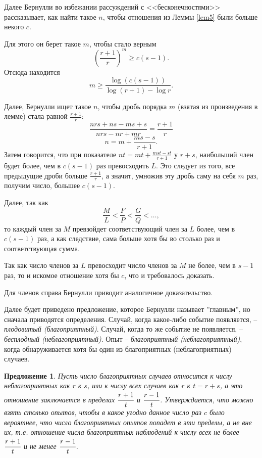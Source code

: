\documentclass[12pt]{extarticle}
\newtheorem{proposition}{Предложение}
\begin{document}
Далее Бернулли во избежании рассуждений с <<бесконечностями>> рассказывает, как найти такое $n$, чтобы отношения из Леммы \ref{lem5} были больше некого $c$.

Для этого он берет такое $m$, чтобы стало верным 
$$\left(\frac{r+1}{r}\right)^m \geqslant c (s-1).$$
Отсюда находится $$m \geqslant \frac{\log (c(s-1))}{\log (r+1) - \log r}.$$

Далее, Бернулли ищет такое $n$, чтобы дробь порядка $m$ (взятая из произведения в лемме) стала равной $\frac{r+1}{r}$:
$$\frac{nrs+ns-ms+s}{nrs-nr+mr} = \frac{r+1}{r}$$ 
$$n = m + \frac{ms-s}{r+1}.$$
Затем говорится, что при показателе $nt = mt+\frac{mst-st}{r+1}$ у $r+s$, наибольший член будет более, чем в $c(s-1)$ раз превосходить  $L$.
Это следует из того, все предыдущие дроби больше $\frac{r+1}{r}$, а значит, умножив эту дробь саму на себя $m$ раз, получим число, большее $c(s-1)$.

Далее, так как $$\frac{M}{L} < \frac{F}{P} < \frac{G}{Q} < \dots,$$
то каждый член за $M$ превзойдет соответствующий член за $L$ более, чем в $c(s-1)$ раз, а как следствие, сама больше хотя бы во столько раз и соответствующая сумма.

Так как число членов за $L$ превосходит число членов за $M$ не более, чем в $s-1$ раз, то и искомое отношение хотя бы $c$, что и требовалось доказать.

Для членов справа Бернулли приводит аналогичное доказательство.

Далее будет приведено предложение, которое Бернулли называет ''главным'', но сначала приводятся определения.
Случай, когда какое-либо событие появляется, -- \textit{плодовитый (благоприятный)}.
Случай, когда то же событие не появляется, -- \textit{бесплодный (неблагоприятный)}.
Опыт -- \textit{благоприятный (неблагоприятный)}, когда обнаруживается хотя бы один из благоприятных (неблагоприятных) случаев.

\begin{proposition}
Пусть число благоприятных случаев относится к числу неблагоприятных как $r$ к $s$, или к числу всех случаев как $r$  к $t=r+s$, а это отношение заключается в пределах $\cfrac{r+1}{t}$ и $\cfrac{r-1}{t}$.
Утверждается, что можно взять столько опытов, чтобы в какое угодно данное число раз $c$ было вероятнее, что число благоприятных опытов попадет в эти пределы, а не вне их, т.е. отношение числа благоприятных наблюдений к числу всех не более $\cfrac{r+1}{t}$ и не менее $\cfrac{r-1}{t}$.
\end{proposition}
\end{document}
